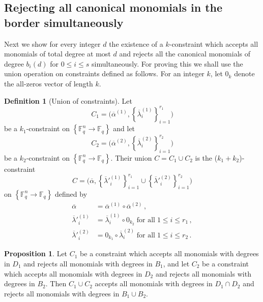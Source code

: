 \documentclass[10pt]{article}
\theoremstyle{definition}
\newtheorem{definition}[theorem]{Definition}
\newtheorem{proposition}[theorem]{Proposition}
\numberwithin{equation}{section}
\newcommand{\F}{{\mathbb{F}}}
\newcommand{\set}[1]{\left\{{#1}\right\}}
\begin{document}
\subsection{Rejecting all canonical monomials in the border simultaneously}
\label{ssec:simult}

Next we show for every integer $d$ the existence of a $k$-constraint which accepts all monomials of total degree at most $d$
and rejects all the canonical monomials of degree $b_i(d)$ for $0 \leq i \leq s$
simultaneously.
For proving this we shall use the union operation on constraints
defined as follows. For an integer $k$, let $0_k$ denote the all-zeros vector of length $k$.

\begin{definition}[Union of constraints]\label{def:union}
Let $$C_1=\bigg(\overline \alpha^{(1)}, \set{\overline \lambda^{(1)}_i}_{i=1}^{r_1}\bigg)$$ be a $k_1$-constraint on $\set{\F_q^n \to \F_q}$ and let
$$C_2=\bigg(\overline \alpha^{(2)}, \set{\overline \lambda^{(2)}_i}_{i=1}^{r_2}\bigg)$$ be a $k_2$-constraint on $\set{\F_q^n \to \F_q}$.
Their union $C = C_1 \cup C_2$ is the ($k_1+k_2$)-constraint  $$C=\bigg(\overline \alpha, \set{\overline \lambda'^{(1)}_i}_{i=1}^{r_1} \cup \set{\overline \lambda'^{(2)}_i}_{i=1}^{r_2}\bigg)$$  on $\set{\F_q^n \to \F_q}$ defined by
\begin{align*}
\overline \alpha &= \overline \alpha^{(1)} \circ \overline \alpha^{(2)}\,,\\
\overline \lambda'^{(1)}_i &= \overline \lambda^{(1)}_i \circ 0_{k_2} \; \text{for all} \; 1 \leq i \leq r_1\,,\\
\overline \lambda'^{(2)}_i &=  0_{k_1} \circ \overline
\lambda^{(2)}_i\; \text{for all} \; 1 \leq i \leq r_2\,.
\end{align*}
\end{definition}
 
\begin{proposition}\label{pro:union}
Let $C_1$ be a constraint which accepts all monomials with degrees in
 $D_1$ and rejects all monomials with degrees in $B_1$, and
let $C_2$ be a constraint which accepts all monomials with degrees in $D_2$ and rejects all monomials with degrees in $B_2$.
Then $C_1 \cup C_2$ accepts all monomials with degrees in $D_1 \cap D_2$ and rejects all monomials with degrees in $B_1 \cup B_2$.
\end{proposition}
\end{document}
